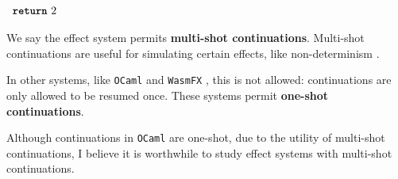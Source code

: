 \begin{enumerate}
\begin{efflst}
          \textcolor{effComment}{$\begin{array}{l}\texttt{\textbf{return}} \,\, {2}\end{array}$}
        \end{efflst}
        
        We say the effect system permits \textbf{multi-shot continuations}. Multi-shot continuations are useful for simulating certain effects, like non-determinism \citep{phipps-costin-2023}. 

        In other systems, like \texttt{OCaml} and \texttt{WasmFX} \citep{phipps-costin-2023}, this is not allowed: continuations are only allowed to be resumed once. These systems permit \textbf{one-shot continuations}. 

        Although continuations in \texttt{OCaml} are one-shot, due to the utility of multi-shot continuations, I believe it is worthwhile to study effect systems with multi-shot continuations.
\end{enumerate}
